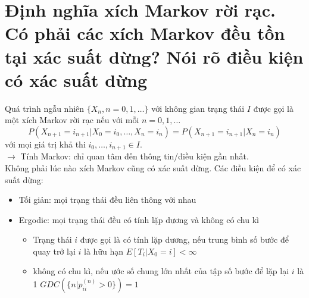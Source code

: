 \documentclass{article}
\begin{document}
\section{Định nghĩa xích Markov rời rạc. Có phải các xích Markov đều tồn tại xác suất dừng? Nói rõ điều kiện có xác suất dừng}
Quá trình ngẫu nhiên $\{X_n, n = 0, 1, \ldots\}$ với không gian trạng thái $I$ được gọi là một xích Markov rời rạc nếu với mỗi $n = 0, 1, \ldots$
\[
P(X_{n+1} = i_{n+1} | X_0 = i_0, \ldots, X_n = i_n) = P(X_{n+1} = i_{n+1} | X_n = i_n)
\]
với mọi giá trị khả thi $i_0, \ldots, i_{n+1} \in I$.\\
$\rightarrow$ Tính Markov: chỉ quan tâm đến thông tin/điều kiện gần nhất.\\
Không phải lúc nào xích Markov cũng có xác suất dừng. Các điều kiện để có xác suất dừng:
\begin{itemize}
    \item Tối giản: mọi trạng thái đều liên thông với nhau
    \item Ergodic: mọi trạng thái đều có tính lặp dương và không có chu kì
    \begin{itemize}
        \item Trạng thái $i$ được gọi là có tính lặp dương, nếu trung bình số bước để quay trở lại $i$ là hữu hạn $E[T_i | X_0 = i] < \infty$
        \item không có chu kì, nếu ước số chung lớn nhất của tập số bước để lặp lại $i$ là 1 $GDC(\{n | p_{ii}^{(n)} > 0\}) = 1$
    \end{itemize}
\end{itemize}
\end{document}
